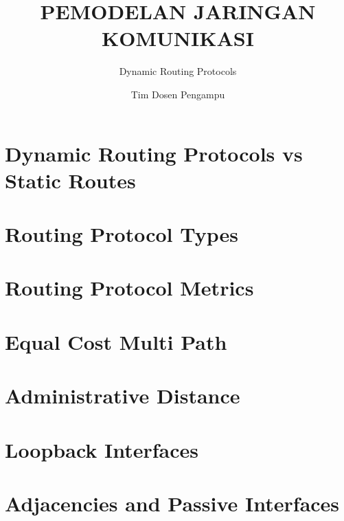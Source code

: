 \documentclass[pdflatex,compress,mathserif]{beamer}
\title{PEMODELAN JARINGAN KOMUNIKASI}
\subtitle{Dynamic Routing Protocols}
\author{Tim Dosen Pengampu}
\begin{document}
\maketitle

\section{Dynamic Routing Protocols vs Static Routes}

\section{Routing Protocol Types}

\section{Routing Protocol Metrics}

\section{Equal Cost Multi Path}

\section{Administrative Distance}

\section{Loopback Interfaces}

\section{Adjacencies and Passive Interfaces}
\end{document}
